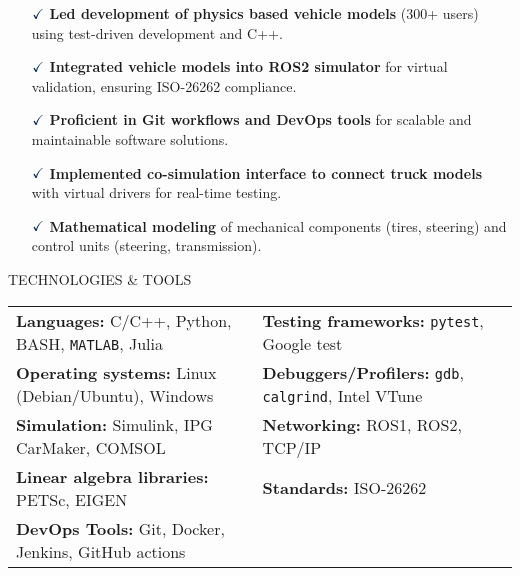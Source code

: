 \documentclass[a4paper,10pt]{article}
\begin{document}
\vspace{0.1cm}
\begin{itemize}
    \item[$\textcolor{highlightcolor}{\checkmark}$] \textcolor{highlightcolor}{\textbf{Led development of physics based vehicle models}} (300+ users) using test-driven development and C++.
    \item[$\textcolor{highlightcolor}{\checkmark}$] \textcolor{highlightcolor}{\textbf{Integrated vehicle models into ROS2 simulator}} for virtual validation, ensuring ISO-26262 compliance.
    \item[$\textcolor{highlightcolor}{\checkmark}$] \textcolor{highlightcolor}{\textbf{Proficient in Git workflows and DevOps tools}} for scalable and maintainable software solutions.
    \item[$\textcolor{highlightcolor}{\checkmark}$] \textcolor{highlightcolor}{\textbf{Implemented co-simulation interface to connect truck models}} with virtual drivers for real-time testing.
    \item[$\textcolor{highlightcolor}{\checkmark}$] \textcolor{highlightcolor}{\textbf{Mathematical modeling}} of mechanical components (tires, steering) and control units (steering, transmission).
\end{itemize}

\noindent{\rule{\linewidth}{1.4pt}}
TECHNOLOGIES \& TOOLS

\vspace{-0.1cm}
\noindent{\rule{\linewidth}{0.01cm}}

\vspace{-0.4cm}
\noindent
\begin{center}
    \begin{tabular}{ @{\hskip 0pt}m{} m{} }
        \textcolor{highlightcolor}{\textbf{Languages:}} C/C++, Python, BASH, {\verb|MATLAB|}, Julia & \textcolor{highlightcolor}{\textbf{Testing frameworks:}} \verb|pytest|, Google test \\ 
        \textcolor{highlightcolor}{\textbf{Operating systems:}} Linux (Debian/Ubuntu), Windows & \textcolor{highlightcolor}{\textbf{Debuggers/Profilers:}} \verb|gdb|, \verb|calgrind|, Intel VTune \\
        \textcolor{highlightcolor}{\textbf{Simulation:}} Simulink, IPG CarMaker, COMSOL & \textcolor{highlightcolor}{\textbf{Networking:}} ROS1, ROS2, TCP/IP \\
        \textcolor{highlightcolor}{\textbf{Linear algebra libraries:}} PETSc, EIGEN & \textcolor{highlightcolor}{\textbf{Standards:}} ISO-26262 \\
        \textcolor{highlightcolor}{\textbf{DevOps Tools:}} Git, Docker, Jenkins, GitHub actions &  \\
    \end{tabular}
\end{center}
\end{document}

